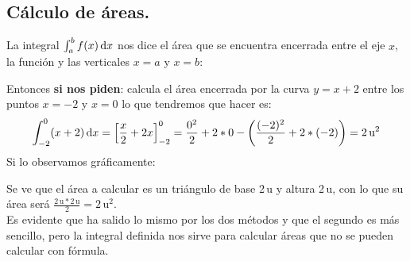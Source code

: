 \documentclass[a4paper,11pt,answers]{exam}
\begin{document}
\subsection{Cálculo de áreas.}
La integral $\integrald{f(x)}{x}{a}{b}$ nos dice el área que se encuentra encerrada entre el eje $x$, la función y las verticales $x=a$ y $x=b$:
\begin{center}
\end{center}

Entonces \textbf{si nos piden}: calcula el área encerrada por la curva $y = x+2$ entre los puntos $x=-2$ y $x = 0$ lo que tendremos que hacer es:
\[\integrald{(x + 2)}{x}{-2}{0} = \left[\frac{x}{2} + 2x\right]_{-2}^0 = \frac{0^2}{2} + 2*0 - \left(\frac{(-2)^2}{2} + 2*(-2) \right) = 2\,\text{u}^2\]
Si lo observamos gráficamente:
\begin{center}
\end{center}
Se ve que el área a calcular es un triángulo de base 2\,u y altura 2\,u, con lo que su área será $\frac{2\,\text{u}*2\,\text{u}}{2} = 2\,\text{u}^2$.\\
Es evidente que ha salido lo mismo por los dos métodos y que el segundo es más sencillo, pero la integral definida nos sirve para calcular áreas que no se pueden calcular con fórmula.\\
\end{document}
